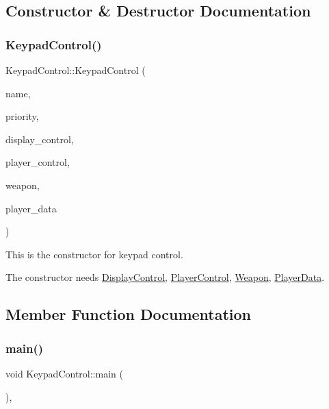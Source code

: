 \subsection{Constructor \& Destructor Documentation}
\mbox{\label{class_keypad_control_a4de1bb3018f819011222461d64aa2d67}} 
\subsubsection{\texorpdfstring{Keypad\+Control()}{KeypadControl()}}
{\footnotesize\ttfamily Keypad\+Control\+::\+Keypad\+Control (\begin{DoxyParamCaption}\item[{const char $\ast$}]{name,  }\item[{int}]{priority,  }\item[{\mbox{\hyperlink{class_display_control}{Display\+Control}} \&}]{display\+\_\+control,  }\item[{\mbox{\hyperlink{class_player_control}{Player\+Control}} \&}]{player\+\_\+control,  }\item[{\mbox{\hyperlink{class_weapon}{Weapon}} \&}]{weapon,  }\item[{\mbox{\hyperlink{class_player_data}{Player\+Data}} \&}]{player\+\_\+data }\end{DoxyParamCaption})\hspace{0.3cm}{\ttfamily [inline]}}



This is the constructor for keypad control. 

The constructor needs \mbox{\hyperlink{class_display_control}{Display\+Control}}, \mbox{\hyperlink{class_player_control}{Player\+Control}}, \mbox{\hyperlink{class_weapon}{Weapon}}, \mbox{\hyperlink{class_player_data}{Player\+Data}}. 

\subsection{Member Function Documentation}
\mbox{\label{class_keypad_control_a66ec8a33eceb20d5d1d243c270c3718b}} 
\subsubsection{\texorpdfstring{main()}{main()}}
{\footnotesize\ttfamily void Keypad\+Control\+::main (\begin{DoxyParamCaption}{ }\end{DoxyParamCaption})\hspace{0.3cm}{\ttfamily [inline]}, {\ttfamily [override]}}



